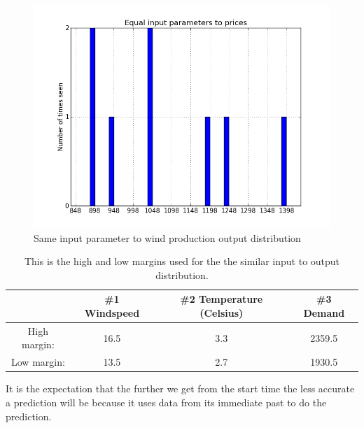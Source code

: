 \begin{figure}[H]
\centering
\includegraphics[width=0.99\linewidth,natwidth=898,natheight=587]{billeder/Equal_wind.png}
\caption{Same input parameter to wind production output distribution}
\label{fig:inputParameterDistribution}
\end{figure}

\begin{table}[H]
\centering  %
\begin{tabular}{c c c c} %
 & \#1 Windspeed & \#2 Temperature (Celsius) & \#3 Demand \\ [0.5ex] %
\hline                  %
High margin: & 16.5 & 3.3 & 2359.5  \\
Low margin: & 13.5 & 2.7 & 1930.5 \\ [1ex] %
\hline %
\end{tabular}
\caption{This is the high and low margins used for the the similar input to output distribution.} %
\label{table:similarHoursLimitsWindProd} %
\end{table}



It is the expectation that the further we get from the start time the less accurate a prediction will be because it uses data from its immediate past to do the prediction. 


